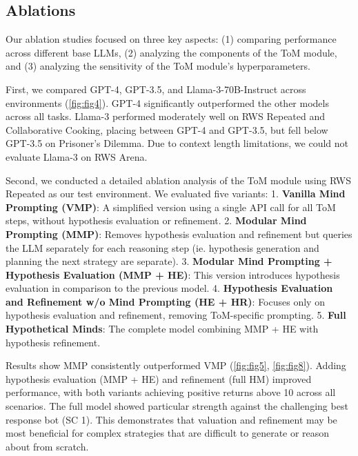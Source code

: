 \documentclass{article} %
\begin{document}

\subsection{Ablations}

Our ablation studies focused on three key aspects: (1) comparing performance across different base LLMs, (2) analyzing the components of the ToM module, and (3) analyzing the sensitivity of the ToM module's hyperparameters.

First, we compared GPT-4, GPT-3.5, and Llama-3-70B-Instruct across environments (\autoref{fig:fig4}). GPT-4 significantly outperformed the other models across all tasks. Llama-3 performed moderately well on RWS Repeated and Collaborative Cooking, placing between GPT-4 and GPT-3.5, but fell below GPT-3.5 on Prisoner's Dilemma. Due to context length limitations, we could not evaluate Llama-3 on RWS Arena.

Second, we conducted a detailed ablation analysis of the ToM module using RWS Repeated as our test environment. We evaluated five variants: 1. \textbf{Vanilla Mind Prompting (VMP)}: A simplified version using a single API call for all ToM steps, without hypothesis evaluation or refinement. 2. \textbf{Modular Mind Prompting (MMP)}: Removes hypothesis evaluation and refinement but queries the LLM separately for each reasoning step (ie. hypothesis generation and planning the next strategy are separate). 3. \textbf{Modular Mind Prompting + Hypothesis Evaluation (MMP + HE)}: This version introduces hypothesis evaluation in comparison to the previous model. 4. \textbf{Hypothesis Evaluation and Refinement w/o Mind Prompting (HE + HR)}: Focuses only on hypothesis evaluation and refinement, removing ToM-specific prompting. 5. \textbf{Full Hypothetical Minds}: The complete model combining MMP + HE with hypothesis refinement.

Results show MMP consistently outperformed VMP (\autoref{fig:fig5}, \autoref{fig:fig8}). Adding hypothesis evaluation (MMP + HE) and refinement (full HM) improved performance, with both variants achieving positive returns above 10 across all scenarios. The full model showed particular strength against the challenging best response bot (SC 1). This demonstrates that valuation and refinement may be most beneficial for complex strategies that are difficult to generate or reason about from scratch.
\end{document}
